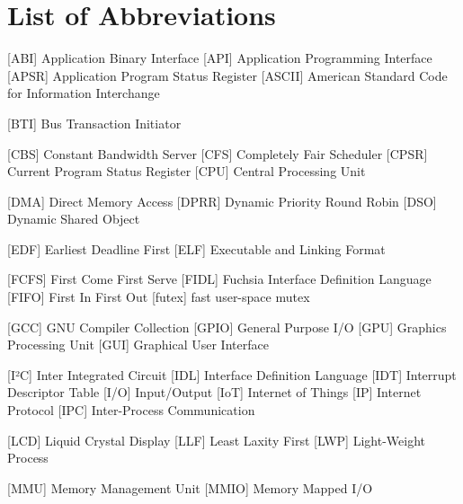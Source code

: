 
\chapter*{List of Abbreviations}

\begin{acronym} [POSIX]
 [ABI] {Application Binary Interface}
 [API] {Application Programming Interface}
 [APSR] {Application Program Status Register}
 [ASCII] {American Standard Code for Information Interchange}

 [BTI] {Bus Transaction Initiator}

 [CBS] {Constant Bandwidth Server}
 [CFS] {Completely Fair Scheduler}
 [CPSR] {Current Program Status Register}
 [CPU] {Central Processing Unit}

 [DMA] {Direct Memory Access}
 [DPRR] {Dynamic Priority Round Robin}
 [DSO] {Dynamic Shared Object}

 [EDF] {Earliest Deadline First}
 [ELF] {Executable and Linking Format}

 [FCFS] {First Come First Serve}
 [FIDL] {Fuchsia Interface Definition Language}
 [FIFO] {First In First Out}
 [futex] {fast user-space mutex}

 [GCC] {GNU Compiler Collection}
[GPIO] {General Purpose I/O}
 [GPU] {Graphics Processing Unit}
 [GUI] {Graphical User Interface}


 [I²C] {Inter Integrated Circuit}
 [IDL] {Interface Definition Language}
 [IDT] {Interrupt Descriptor Table}
 [I/O] {Input/Output}
[IoT] {Internet of Things}
 [IP] {Internet Protocol}
[IPC] {Inter-Process Communication}



 [LCD] {Liquid Crystal Display}
 [LLF] {Least Laxity First}
 [LWP] {Light-Weight Process}

 [MMU] {Memory Management Unit}
[MMIO] {Memory Mapped I/O}




\end{acronym}
